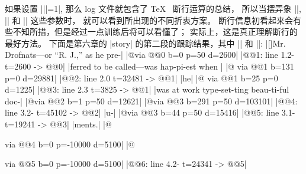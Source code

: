 \ddanger 如果设置 |\tracingparagraphs||=1|, 那么 log 文件就包含了 \TeX\ %
断行运算的总结，
所以当摆弄象 |\linepenalty|, |\hyphenpenalty| 和 |\adjdemerits| 这些参数时，
就可以看到所出现的不同折衷方案。%
断行信息初看起来会有些不知所措，但是经过一点训练后将可以看懂了；
实际上，这是真正理解断行的最好方法。%
下面是第六章的 |story| 的第二段的跟踪结果，其中 |\hsize=2.5in| 和 ||:
\begindisplay
|[]\tenrm Mr. Drofnats---or ``R. J.,'' as he pre-|\cr
|@\discretionary via @@0 b=0 p=50 d=2600|\cr
|@@1: line 1.2- t=2600 -> @@0|\cr
|ferred to be called---was hap-pi-est when |\cr
|@ via @@1 b=131 p=0 d=29881|\cr
|@@2: line 2.0 t=32481 -> @@1|\cr
|he|\cr
|@ via @@1 b=25 p=0 d=1225|\cr
|@@3: line 2.3 t=3825 -> @@1|\cr
|was at work type-set-ting beau-ti-ful doc-|\cr
|@\discretionary via @@2 b=1 p=50 d=12621|\cr
|@\discretionary via @@3 b=291 p=50 d=103101|\cr
|@@4: line 3.2- t=45102 -> @@2|\cr
|u-|\cr
|@\discretionary via @@3 b=44 p=50 d=15416|\cr
|@@5: line 3.1- t=19241 -> @@3|\cr
|ments.|\cr
|@\par via @@4 b=0 p=-10000 d=5100|\cr
|@\par via @@5 b=0 p=-10000 d=5100|\cr
|@@6: line 4.2- t=24341 -> @@5|\cr
